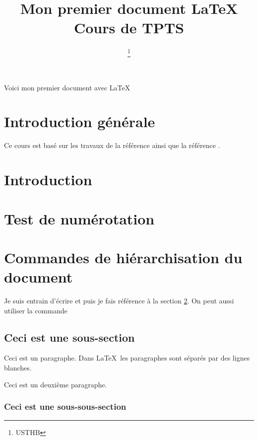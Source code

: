 \documentclass[a4paper,11pt]{article}
\title{Mon premier document \LaTeX \\ Cours de TPTS}
\author{\nompropre{J. Messamah} \and \nompropre{Mazri} \thanks{USTHB}}
\date{}
\begin{document}
\maketitle

\tableofcontents

Voici mon premier document avec \LaTeX

\section*{Introduction générale}

Ce cours est basé sur les travaux de la référence \cite{Lamport1994} ainsi que la référence \cite[page 4]{messamah2015quantum}.

\section{Introduction}


\section{Test de numérotation}
\label{section/referenceTest}

\section{Commandes de hiérarchisation du document}

Je suis entrain d'écrire et puis je fais référence à la section \ref{section/referenceTest}. On peut aussi utiliser la commande \pageref{section/referenceTest}

\subsection{Ceci est une sous-section}

Ceci est un paragraphe. Dans \LaTeX\ les paragraphes sont séparés par des lignes blanches.

Ceci est un deuxième paragraphe.

\subsubsection{Ceci est une sous-sous-section}
\end{document}
